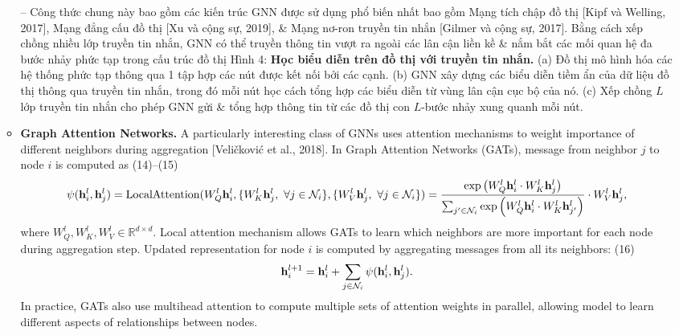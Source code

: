\documentclass{article}
\begin{document}
\begin{itemize}
\begin{itemize}
        -- Công thức chung này bao gồm các kiến trúc GNN được sử dụng phổ biến nhất bao gồm Mạng tích chập đồ thị [Kipf và Welling, 2017], Mạng đẳng cấu đồ thị [Xu và cộng sự, 2019], \& Mạng nơ-ron truyền tin nhắn [Gilmer và cộng sự, 2017]. Bằng cách xếp chồng nhiều lớp truyền tin nhắn, GNN có thể truyền thông tin vượt ra ngoài các lân cận liền kề \& nắm bắt các mối quan hệ đa bước nhảy phức tạp trong cấu trúc đồ thị {\sf Hình 4: {\bf Học biểu diễn trên đồ thị với truyền tin nhắn.} (a) Đồ thị mô hình hóa các hệ thống phức tạp thông qua 1 tập hợp các nút được kết nối bởi các cạnh. (b) GNN xây dựng các biểu diễn tiềm ẩn của dữ liệu đồ thị thông qua truyền tin nhắn, trong đó mỗi nút học cách tổng hợp các biểu diễn từ vùng lân cận cục bộ của nó. (c) Xếp chồng $L$ lớp truyền tin nhắn cho phép GNN gửi \& tổng hợp thông tin từ các đồ thị con $L$-bước nhảy xung quanh mỗi nút.}
        \item {\bf Graph Attention Networks.} A particularly interesting class of GNNs uses attention mechanisms to weight importance of different neighbors during aggregation [Veličković et al., 2018]. In Graph Attention Networks (GATs), message from neighbor $j$ to node $i$ is computed as (14)--(15)
        \begin{equation*}
            \psi({\bf h}_i^l,{\bf h}_j^l) = {\rm LocalAttention}(W_Q^l{\bf h}_i^l,\{W_K^l{\bf h}_j^l,\ \forall j\in{\cal N}_i\},\{W_V^l{\bf h}_j^l,\ \forall j\in{\cal N}_i\}) = \frac{\exp\left(W_Q^l{\bf h}_i^l\cdot W_K^l{\bf h}_j^l\right)}{\sum_{j'\in{\cal N}_i} \exp\left(W_Q^l{\bf h}_i^l\cdot W_K^l{\bf h}_{j'}^l\right)}\cdot W_V^l{\bf h}_j^l,
        \end{equation*}
        where $W_Q^l,W_K^l,W_V^l\in\mathbb{R}^{d\times d}$. Local attention mechanism allows GATs to learn which neighbors are more important for each node during aggregation step. Updated representation for node $i$ is computed by aggregating messages from all its neighbors: (16)
        \begin{equation*}
            {\bf h}_i^{l + 1} = {\bf h}_i^l + \sum_{j\in{\cal N}_i} \psi({\bf h}_i^l,{\bf h}_j^l).
        \end{equation*}
        In practice, GATs also use multihead attention to compute multiple sets of attention weights in parallel, allowing model to learn different aspects of relationships between nodes.
        

\end{itemize}
\end{itemize}
\end{document}

